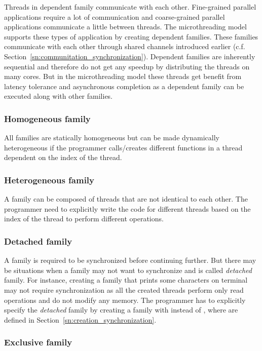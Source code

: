 \documentclass{article}
\begin{document}
Threads in dependent family communicate with each other. Fine-grained parallel
applications require a lot of communication and coarse-grained parallel
applications communicate a little between threads. The microthreading model
supports these types of application by creating dependent families. These
families communicate with each other through shared channels introduced earlier
(c.f. Section~\ref{sn:communitation_synchronization}). Dependent families are
inherently sequential and therefore do not get any speedup by distributing the
threads on many cores. But in the microthreading model these threads get
benefit from latency tolerance and asynchronous completion as a dependent
family can be executed along with other families. 

\subsubsection*{Homogeneous family}

All families are statically homogeneous but can be made dynamically
heterogeneous if the programmer calls/creates different functions in a thread
dependent on the index of the thread.

\subsubsection*{Heterogeneous family}

A family can be composed of threads that are not identical to each other. The
programmer need to explicitly write the code for different threads based on the
index of the thread to perform different operations. 

\subsubsection*{Detached family}

A family is required to be synchronized before continuing further. But there
may be situations when a family may not want to synchronize and is called
\emph{detached} family. For instance, creating a family that prints some
characters on terminal may not require synchronization as all the created
threads perform only read operations and do not modify any memory. The
programmer has to explicitly specify the \emph{detached} family by creating a
family with  instead of ,
where  are defined in Section~\ref{sn:creation_synchronization}.

\subsubsection*{Exclusive family}
\end{document}
